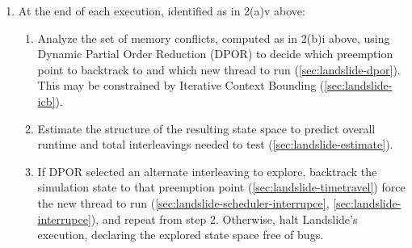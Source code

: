 {\begin{enumerate}
\begin{enumerate}
\begin{enumerate}
					\item Check the set of memory accesses since the previous preemption point,
						recorded as in 2(a)ii above,
						for conflicts with other threads
						(\cref{sec:landslide-shm}),
						and further for data races (\cref{sec:landslide-datarace}).
					\item Select which thread should run next (\cref{sec:landslide-arbiter}).
						Heuristically detecting yield-blocked threads
						may inform this decision (\cref{sec:landslide-blocking-yield}).
					\item Checkpoint the execution state in case future executions
						should wish to rewind and try a different thread from the one first chosen here
						(\cref{sec:landslide-save}, \cref{sec:landslide-timetravel}).
					\item Force the chosen thread to run by injecting timer interrupts
						(\cref{sec:landslide-scheduler-interrupce},
						\cref{sec:landslide-interrupce}).
				\end{enumerate}
				Note that Landslide maintains the invariant that each transition between two preemption points
				consist of instructions executed by exactly one thread;
				i.e., every thread switch must be punctuated by a preemption point.
		\end{enumerate}
	\item At the end of each execution, identified as in 2(a)v above:
		\begin{enumerate}
			\item Analyze the set of memory conflicts,
				computed as in 2(b)i above,
				using Dynamic Partial Order Reduction (DPOR)
				to decide which preemption point to backtrack to and
				which new thread to run
				(\cref{sec:landslide-dpor}).
				This may be constrained by Iterative Context Bounding (\cref{sec:landslide-icb}).
			\item Estimate the structure of the resulting state space
				to predict overall runtime and total interleavings needed to test
				(\cref{sec:landslide-estimate}).
			\item If DPOR selected an alternate interleaving to explore,
				backtrack the simulation state to that preemption point
				(\cref{sec:landslide-timetravel})
				force the new thread to run
				(\cref{sec:landslide-scheduler-interrupce},
				\cref{sec:landslide-interrupce}),
				and repeat from step 2.
				Otherwise, halt Landslide's execution,
				declaring the explored state space free of bugs.
		\end{enumerate}
\end{enumerate}
}

